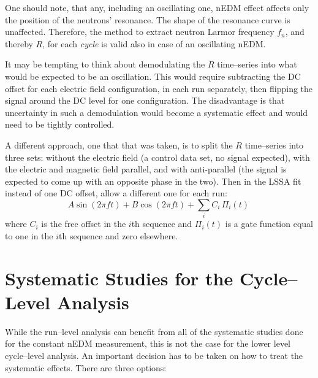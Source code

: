One should note, that any, including an oscillating one, nEDM effect affects only the position of the neutrons' resonance. The shape of the resonance curve is unaffected. Therefore, the method to extract neutron Larmor frequency $f_n$, and thereby $R$, for each \emph{cycle} is valid also in case of an oscillating nEDM.

It may be tempting to think about demodulating the $R$ time--series into what would be expected to be an oscillation. This would require subtracting the DC offset for each electric field configuration, in each run separately, then flipping the signal around the DC level for one configuration.  The disadvantage is that uncertainty in such a demodulation would become a systematic effect and would need to be tightly controlled.

A different approach, one that that was taken, is to split the $R$ time--series into three sets: without the electric field (a control data set, no signal expected), with the electric and magnetic field parallel, and with anti-parallel (the signal is expected to come up with an opposite phase in the two). Then in the LSSA fit instead of one DC offset, allow a different one for each run:
\begin{equation}
  \label{eq:axions_LSSA}
  A\sin(2 \pi f t) + B\cos(2 \pi f t) + \sum_i C_i\,\Pi_i(t) \,
\end{equation}
where $C_i$ is the free offset in the $i$th sequence and $\Pi_i(t)$ is a gate function equal to one in the $i$th sequence and zero elsewhere.






\section{Systematic Studies for the Cycle--Level Analysis}
While the run--level analysis can benefit from all of the systematic studies done for the constant nEDM measurement, this is not the case for the lower level cycle--level analysis. An important decision has to be taken on how to treat the systematic effects. There are three options:


